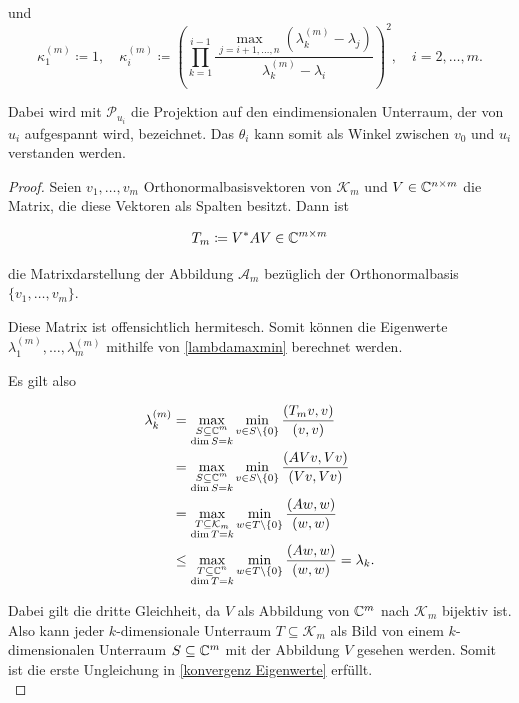 \documentclass{article}
\begin{document}
\begin{theorem}
\begin{theorem}
	und
	\begin{equation*}
		\kappa_1^{(m)} \coloneqq 1, \quad \kappa_i^{(m)} \coloneqq \left(\prod_{k=1}^{i-1} \frac{\max_{j=i+1,\dots,n} (\lambda_k^{(m)} - \lambda_j)}{\lambda_k^{(m)} - \lambda_i}\right)^2, \quad i = 2,\dots,m.
	\end{equation*}

	Dabei wird mit $\mathcal{P}_{u_i}$ die Projektion auf den eindimensionalen Unterraum, der von $u_i$ aufgespannt wird, bezeichnet. Das $\theta_i$ kann somit als Winkel zwischen $v_0$ und $u_i$  verstanden werden.
	\begin{proof}

	Seien $v_1, \dots, v_m$ Orthonormalbasisvektoren von $\mathcal{K}_m$ und $V \in \mathbb{C}^{n\times m}$ die Matrix, die diese Vektoren als Spalten besitzt. Dann ist

	\begin{equation*}
		T_m \coloneqq V^* A V \in \mathbb{C}^{m\times m}
	\end{equation*}

	die Matrixdarstellung der Abbildung $\mathcal{A}_m$ bezüglich der Orthonormalbasis $\{v_1,\dots,v_m\}$.

	Diese Matrix ist offensichtlich hermitesch. Somit können die Eigenwerte $\lambda_1^{(m)}, \dots, \lambda_m^{(m)}$ mithilfe von \eqref{lambdamaxmin} berechnet werden.

	Es gilt also

	\begin{equation}
		\label{Eigenwert_Ungl}
		\begin{aligned}
			\lambda_k^{(m)} &= \max_{\substack{S \subseteq \mathbb{C}^m\\ \dim S = k}} \min_{v\in S\setminus\{0\}} \frac{(T_m v,v)}{(v,v)} \\
			&= \max_{\substack{S \subseteq \mathbb{C}^m\\ \dim S = k}} \min_{v\in S\setminus\{0\}} \frac{(AVv,Vv)}{(Vv,Vv)}\\
			&= \max_{\substack{T \subseteq \mathcal{K}_m \\ \dim T = k}} \min_{w\in T\setminus\{0\}} \frac{(Aw,w)}{(w,w)}\\
			 &\le \max_{\substack{T \subseteq \mathbb{C}^n\\ \dim T = k}} \min_{w\in T\setminus\{0\}} \frac{(Aw,w)}{(w,w)} = \lambda_k.
		\end{aligned}
	\end{equation}

	Dabei gilt die dritte Gleichheit, da $V$ als Abbildung von $\mathbb{C}^m$ nach $\mathcal{K}_m$ bijektiv ist. Also kann jeder $k$-dimensionale Unterraum $T \subseteq \mathcal{K}_m$ als Bild von einem $k$-dimensionalen Unterraum $S \subseteq \mathbb{C}^m$ mit der Abbildung $V$ gesehen werden.
	Somit ist die erste Ungleichung in \eqref{konvergenz Eigenwerte} erfüllt.\\


\end{proof}
\end{theorem}
\end{theorem}
\end{document}

